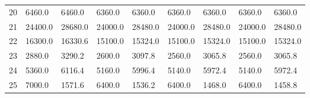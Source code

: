 \begin{tabular}{|r|l|l|l|l|l|l|l|l|}
  20 & 6460.0 & 6460.0 & 6360.0 & 6360.0 & 6360.0 & 6360.0 & 6360.0 & 6360.0 \\ 
  21 & 24400.0 & 28680.0 & 24000.0 & 28480.0 & 24000.0 & 28480.0 & 24000.0 & 28480.0 \\ 
  22 & 16300.0 & 16330.6 & 15100.0 & 15324.0 & 15100.0 & 15324.0 & 15100.0 & 15324.0 \\ 
  23 & 2880.0 & 3290.2 & 2600.0 & 3097.8 & 2560.0 & 3065.8 & 2560.0 & 3065.8 \\ 
  24 & 5360.0 & 6116.4 & 5160.0 & 5996.4 & 5140.0 & 5972.4 & 5140.0 & 5972.4 \\ 
  25 & 7000.0 & 1571.6 & 6400.0 & 1536.2 & 6400.0 & 1468.0 & 6400.0 & 1458.8 \\ 
\end{tabular}
